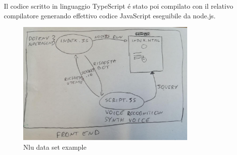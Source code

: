 Il codice scritto in linguaggio TypeScript \'e stato poi compilato con il relativo compilatore generando effettivo codice JavaScript eseguibile da node.js.
\begin{figure}[H]
 \centering
  \includegraphics[width=0.8\textwidth]{img/frontend.jpg}
 \caption{Nlu data set example}
\end{figure}

